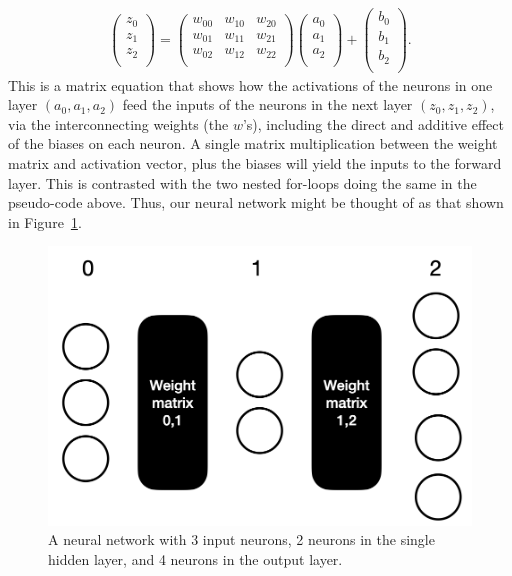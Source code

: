\documentclass[12pt]{article}
\begin{document}
  \begin{align}
    \begin{pmatrix}
           z_{0} \\
           z_{1} \\
           z_{2} \\
         \end{pmatrix}
=
 \begin{pmatrix}
           w_{00} &w_{10} & w_{20}  \\
           w_{01} &w_{11} & w_{21}  \\
  	  w_{02} &w_{12} & w_{22} \\
         \end{pmatrix}
     \begin{pmatrix}
           a_{0} \\
           a_{1} \\
           a_{2} \\
         \end{pmatrix}
+
    \begin{pmatrix}
           b_{0} \\
           b_{1} \\
           b_{2} \\
         \end{pmatrix}.
  \end{align}
This is a matrix equation that shows how the activations of the neurons in one layer $(a_0, a_1, a_2)$ feed the inputs of the neurons in the next layer $(z_0, z_1, z_2)$, via the interconnecting weights (the $w$'s), including the direct and additive effect of the biases on each neuron.  A single matrix multiplication between the weight matrix and activation vector, plus the biases will yield the inputs to the forward layer. This is contrasted with the two nested for-loops doing the same in the pseudo-code above.  Thus, our neural network might be thought of as that shown in Figure~\ref{nn_layers_weights}.

 \begin{figure}[h]
\begin{center}
\includegraphics[scale=0.3]{Figs/nn_layers_weights}
\caption{A neural network with 3 input neurons, 2 neurons in the single hidden layer, and 4 neurons in the output layer.}
\label{nn_layers_weights}
\end{center}
\end{figure}
\end{document}
